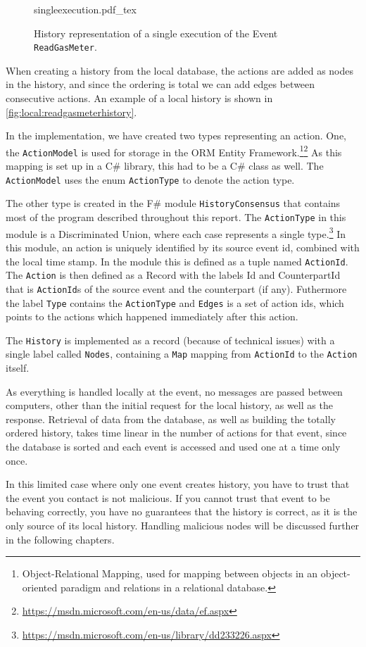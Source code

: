 	\begin{figure}
		\centering
		{singleexecution.pdf_tex}
		\caption{History representation of a single execution of the Event \texttt{ReadGasMeter}.}
		\label{fig:local:readgasmeterhistory}
	\end{figure}
	\newpar When creating a history from the local database, the actions are added as nodes in the history, and since the ordering is total we can add edges between consecutive actions. An example of a local history is shown in \autoref{fig:local:readgasmeterhistory}.
	
	\newpar In the implementation, we have created two types representing an action. One, the \texttt{ActionModel} is used for storage in the ORM Entity Framework.\footnote{Object-Relational Mapping, used for mapping between objects in an object-oriented paradigm and relations in a relational database.}\footnote{\url{https://msdn.microsoft.com/en-us/data/ef.aspx}} As this mapping is set up in a C\# library, this had to be a C\# class as well. The \texttt{ActionModel} uses the enum \texttt{ActionType} to denote the action type.
	
	The other type is created in the F\# module \texttt{HistoryConsensus} that contains most of the program described throughout this report. The \texttt{ActionType} in this module is a Discriminated Union, where each case represents a single type.\footnote{\url{https://msdn.microsoft.com/en-us/library/dd233226.aspx}}
	In this module, an action is uniquely identified by its source event id, combined with the local time stamp. In the module this is defined as a tuple named \texttt{ActionId}.
	The \texttt{Action} is then defined as a Record with the labels Id and CounterpartId that is \texttt{ActionId}s of the source event and the counterpart (if any). Futhermore the label \texttt{Type} contains the \texttt{ActionType} and \texttt{Edges} is a set of action ids, which points to the actions which happened immediately after this action.
	
	The \texttt{History} is implemented as a record (because of technical issues) with a single label called \texttt{Nodes}, containing a \texttt{Map} mapping from \texttt{ActionId} to the \texttt{Action} itself.
	
	\newpar As everything is handled locally at the event, no messages are passed between computers, other than the initial request for the local history, as well as the response. Retrieval of data from the database, as well as building the totally ordered history, takes time linear in the number of actions for that event, since the database is sorted and each event is accessed and used one at a time only once.
	
	\newpar In this limited case where only one event creates history, you have to trust that the event you contact is not malicious. If you cannot trust that event to be behaving correctly, you have no guarantees that the history is correct, as it is the only source of its local history. Handling malicious nodes will be discussed further in the following chapters.
